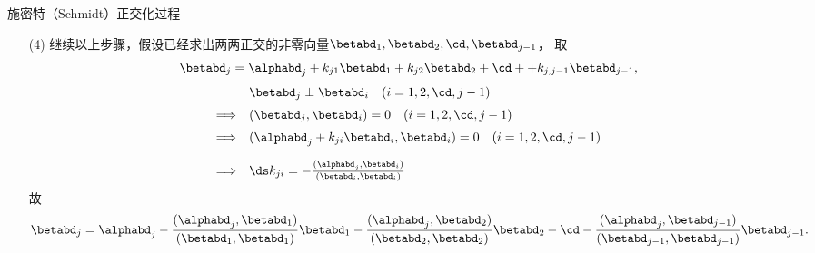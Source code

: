 \begin{frame}
  \begin{footnotesize}
    \begin{block}{施密特（Schmidt）正交化过程}
      
      \begin{itemize}
      \item[(4)] 继续以上步骤，假设已经求出两两正交的非零向量$\betabd_1,\betabd_2,\cd,\betabd_{j-1}$，
        取
        $$
        \betabd_j=\alphabd_j+k_{j1}\betabd_1+k_{j2}\betabd_2+\cd++k_{j,j-1}\betabd_{j-1},
        $$
        $$
        \begin{array}{rl}
          & \betabd_j \perp \betabd_i\quad (i=1,2,\cd,j-1)\\[0.2cm]
          \Longrightarrow &(\betabd_j,\betabd_i)=0 \quad (i=1,2,\cd,j-1)\\[0.2cm]
          \Longrightarrow &(\alphabd_j+k_{ji}\betabd_i,\betabd_i)=0 \quad (i=1,2,\cd,j-1)\\[0.4cm]
          \Longrightarrow& \ds k_{ji}=-\frac{(\alphabd_j,\betabd_i)}{(\betabd_i,\betabd_i)}
        \end{array}
        $$
        故
        $$
        \betabd_j=\alphabd_j-\frac{(\alphabd_j,\betabd_1)}{(\betabd_1,\betabd_1)}\betabd_1
        -\frac{(\alphabd_j,\betabd_2)}{(\betabd_2,\betabd_2)}\betabd_2
        -\cd
        -\frac{(\alphabd_j,\betabd_{j-1})}{(\betabd_{j-1},\betabd_{j-1})}\betabd_{j-1}.
        $$
      \end{itemize}
    \end{block}
  \end{footnotesize}
\end{frame}


\begin{frame}
  \begin{footnotesize}
    
  \end{footnotesize}
\end{frame}


\begin{frame}
  \begin{footnotesize}
    
  \end{footnotesize}
\end{frame}


\begin{frame}
  \begin{footnotesize}
    
  \end{footnotesize}
\end{frame}
